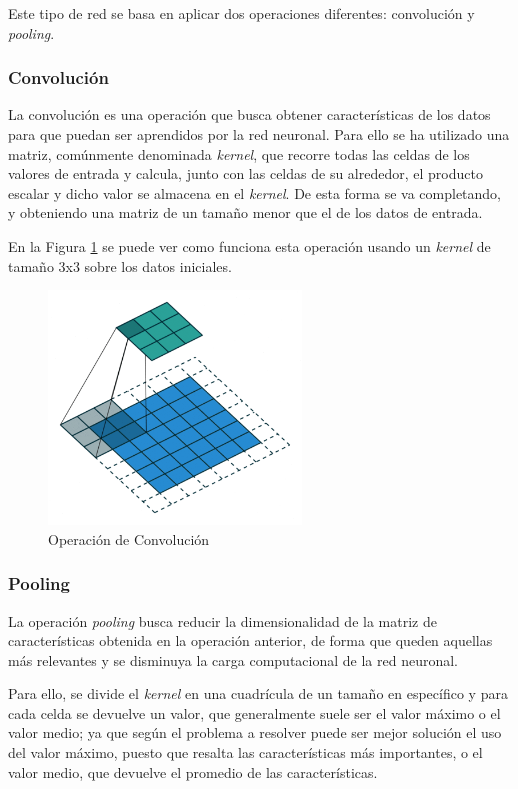 Este tipo de red se basa en aplicar dos operaciones diferentes: convolución y \emph{pooling}.

\subsubsection{Convolución}
La convolución es una operación que busca obtener características de los datos para que puedan ser aprendidos por la red neuronal. Para ello se ha utilizado una matriz, comúnmente denominada \emph{kernel}, que recorre todas las celdas de los valores de entrada y calcula, junto con las celdas de su alrededor, el producto escalar y dicho valor se almacena en el \emph{kernel}. De esta forma se va completando, y obteniendo una matriz de un tamaño menor que el de los datos de entrada.

En la Figura \ref{f:convo} se puede ver como funciona esta operación usando un \emph{kernel} de tamaño 3x3 sobre los datos iniciales.

\begin{figure}[h]
 \centering
  \includegraphics[width=0.6\textwidth]{img/Convo.png}
 \caption{Operación de Convolución \cite{wiki:convo}}
 \label{f:convo}
\end{figure}

\subsubsection{Pooling}
La operación \emph{pooling} busca reducir la dimensionalidad de la matriz de características obtenida en la operación anterior, de forma que queden aquellas más relevantes y se disminuya la carga computacional de la red neuronal.

Para ello, se divide el \emph{kernel} en una cuadrícula de un tamaño en específico y para cada celda se devuelve un valor, que generalmente suele ser el valor máximo o el valor medio; ya que según el problema a resolver puede ser mejor solución el uso del valor máximo, puesto que resalta las características más importantes, o el valor medio, que devuelve el promedio de las características.

